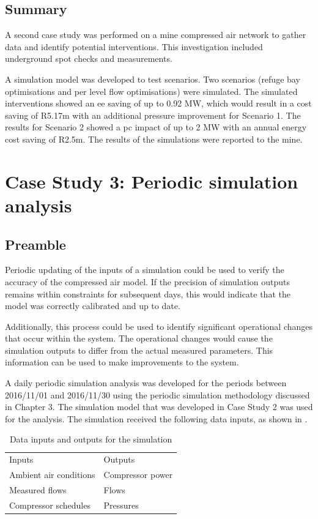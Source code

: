 	\subsection{Summary}
	A second case study was performed on a mine compressed air network to gather data and identify potential interventions. This investigation included underground spot checks and measurements.
	\par 
	 A simulation model was developed to test scenarios. Two scenarios (refuge bay optimisations and per level flow optimisations) were simulated. The simulated interventions showed an \gls{ee} saving of up to 0.92 MW, which would result in a cost saving of R5.17m with an additional pressure improvement for Scenario 1. The results for Scenario 2 showed a \gls{pc} impact of up to 2 MW with an annual energy cost saving of R2.5m. The results of the simulations were reported to the mine.
\section{Case Study 3: Periodic simulation analysis}
	\subsection{Preamble}
	Periodic updating of the inputs of a simulation could be used to verify the accuracy of the compressed air model. If the precision of simulation outputs remains within constraints for subsequent days, this would indicate that the model was correctly calibrated and up to date.
	\par 
	 Additionally, this process could be used to identify significant operational changes that occur within the system. The operational changes would cause the simulation outputs to differ from the actual measured parameters. This information can be used to make improvements to the system.
	\par 
	A daily periodic simulation analysis was developed for the periods between 2016/11/01 and 2016/11/30 using the periodic simulation methodology discussed in Chapter 3. The simulation model that was developed in Case Study 2 was used for the analysis. The simulation received the following data inputs, as shown in .
	\\
	\begin{table}[h!]
		\caption{Data inputs and outputs for the simulation}
		\centering
		\begin{tabular}{ll}
			\hline
			Inputs \hspace*{4cm} &Outputs \hspace*{4cm} \\ \hhline{==}
			Ambient air conditions&Compressor power \\
			Measured flows& Flows \\
			Compressor schedules& Pressures \\
			\hline
		\end{tabular}
		
		\label{table: Periodic inputs/outputs}
	\end{table}

